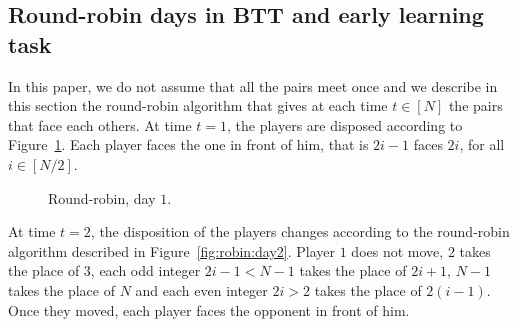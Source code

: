 \subsection{Round-robin days in BTT and early learning task}
In this paper, we do not assume that all the pairs meet once and we describe in this section the round-robin algorithm that gives at each time $t\in[N]$ the pairs that face each others. At time $t=1$, the players are disposed according to Figure~\ref{fig:robin:day1}. Each player faces the one in front of him, that is $2i-1$ faces $2i$, for all $i\in[N/2]$. 
\begin{figure}
\centering
{}
\caption{Round-robin, day $1$.}
\label{fig:robin:day1}
\end{figure}
At time $t=2$, the disposition of the players changes according to the round-robin algorithm described in Figure~\ref{fig:robin:day2}. Player $1$ does not move, $2$ takes the place of $3$, each odd integer $2i-1<N-1$ takes the place of $2i+1$, $N-1$ takes the place of $N$ and each even integer $2i>2$ takes the place of $2(i-1)$. Once they moved, each player faces the opponent in front of him.
